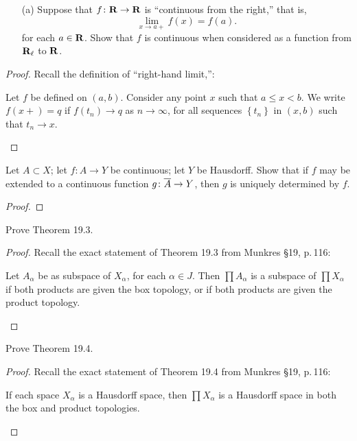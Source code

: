 \begin{problem}[Munkres \S18, p.\,111, \#7(a)]
\begin{enumerate}[noitemsep]
\item[(a)] Suppose that $f\colon\mathbf{R}\to\mathbf{R}$ is ``continuous from
  the right,'' that is,
  \[
    \lim_{x\to a+}f(x)=f(a).
  \]
  for each $a\in\mathbf{R}$. Show that $f$ is continuous when considered
  as a function from $\mathbf{R}_\ell$ to $\mathbf{R}$.
\end{enumerate}
\end{problem}
\begin{proof}
Recall the definition of ``right-hand limit,'':
\begin{definition*}
Let $f$ be defined on $(a,b)$. Consider any point $x$ such that
$a\leq x<b$. We write $f(x+)=q$ if $f(t_n)\to q$ as $n\to\infty$,
for all sequences $\left\{t_n\right\}$ in $(x,b)$ such that
$t_n\to x$.
\end{definition*}
\end{proof}
\newpage
\begin{problem}[Munkres \S18, p.\,112, \#13]
Let $A\subset X$; let $f\colon A\to Y$ be continuous; let $Y$ be
Hausdorff. Show that if $f$ may be extended to a continuous
function $g\colon\overline{A}\to Y$, then $g$ is uniquely determined
by $f$.
\end{problem}
\begin{proof}
\end{proof}
\newpage
\begin{problem}[Munkres \S19, p.\,118, \#2]
Prove Theorem 19.3.
\end{problem}
\begin{proof}
Recall the exact statement of Theorem 19.3 from Munkres \S19,
p.\,116:
\begin{theorem*}
Let $A_\alpha$ be as subspace of $X_\alpha$, for each $\alpha\in
J$. Then $\prod A_\alpha$ is a subspace of $\prod X_\alpha$ if
both products are given the box topology, or if both products are
given the product topology.
\end{theorem*}
\end{proof}
\newpage
\begin{problem}[Munkres \S19, p.\,118, \#3]
Prove Theorem 19.4.
\end{problem}
\begin{proof}
Recall the exact statement of Theorem 19.4 from Munkres \S19,
p.\,116:
\begin{theorem*}
If each space $X_\alpha$ is a Hausdorff space, then $\prod
X_\alpha$ is a Hausdorff space in both the box and product
topologies.
\end{theorem*}
\end{proof}
